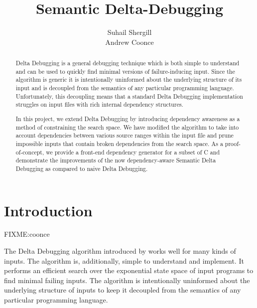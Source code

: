 \documentclass[preprint]{acm_proc_article-sp}
\begin{document}
\title{Semantic Delta-Debugging}


\author{
\alignauthor
Suhail Shergill\\
\alignauthor
Andrew Coonce\\
}

\date{}

\maketitle
\begin{abstract}
Delta Debugging is a general debugging technique which is both simple to
understand and can be used to quickly find minimal versions of failure-inducing
input. Since the algorithm is generic it is intentionally uninformed about the
underlying structure of its input and is decoupled from the semantics of any
particular programming language. Unfortunately, this decoupling means that a
standard Delta Debugging implementation struggles on input files with rich
internal dependency structures.

In this project, we extend Delta Debugging by introducing dependency awareness
as a method of constraining the search space. We have modified the algorithm to
take into account dependencies between various source ranges within the input
file and prune impossible inputs that contain broken dependencies from the
search space. As a proof-of-concept, we provide a front-end dependency generator
for a subset of C and demonstrate the improvements of the now dependency-aware
Semantic Delta Debugging as compared to naive Delta Debugging.
\end{abstract}




\section{Introduction}
\label{sec:intro}
FIXME:coonce

The Delta Debugging algorithm introduced by \citet{dd} works well
for many kinds of inputs. The algorithm is, additionally, simple to understand
and implement. It performs an efficient search over the exponential state space
of input programs to find minimal failing inputs. The algorithm is intentionally
uninformed about the underlying structure of inputs to keep it decoupled from
the semantics of any particular programming language.
\end{document}
